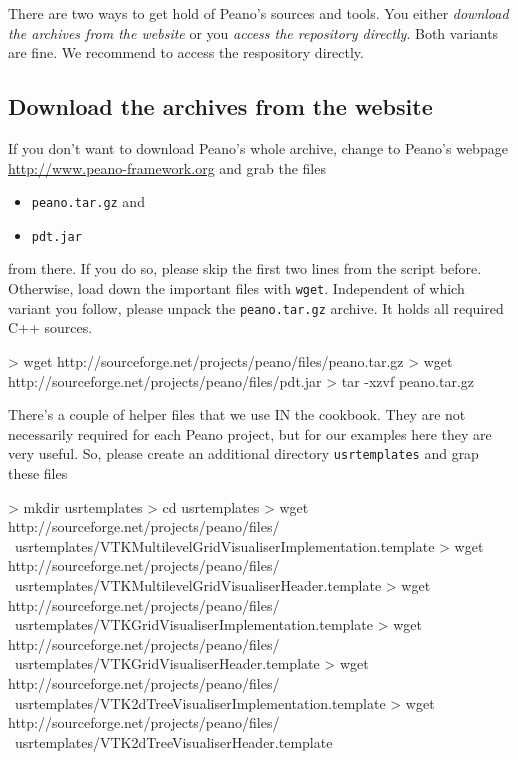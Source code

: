 There are two ways to get hold of Peano's sources and tools. You either {\em
download the archives from the website} or you {\em access the repository
directly}.
Both variants are fine.
We recommend to access the respository directly.


\subsection{Download the archives from the website}

If you don't want to download Peano's whole archive, change to Peano's webpage
\url{http://www.peano-framework.org} and grab the files
\begin{itemize}
  \item \texttt{peano.tar.gz} and
  \item \texttt{pdt.jar}
\end{itemize}
from there. If you do so, please skip the first two lines from the script
before. Otherwise, load down the important files with \texttt{wget}. 
Independent of which variant you follow, please unpack the \texttt{peano.tar.gz}
archive. 
It holds all required C++ sources.

\begin{code}
> wget http://sourceforge.net/projects/peano/files/peano.tar.gz
> wget http://sourceforge.net/projects/peano/files/pdt.jar
> tar -xzvf peano.tar.gz
\end{code}


\noindent
There's a couple of helper files that we use IN the
cookbook. 
They are not necessarily required for each Peano project, but for our examples
here they are very useful.
So, please create an additional directory \texttt{usrtemplates} and grap
these files

\begin{code}
> mkdir usrtemplates
> cd usrtemplates
> wget http://sourceforge.net/projects/peano/files/ \
  usrtemplates/VTKMultilevelGridVisualiserImplementation.template 
> wget http://sourceforge.net/projects/peano/files/ \
  usrtemplates/VTKMultilevelGridVisualiserHeader.template 
> wget http://sourceforge.net/projects/peano/files/ \
  usrtemplates/VTKGridVisualiserImplementation.template 
> wget http://sourceforge.net/projects/peano/files/ \
  usrtemplates/VTKGridVisualiserHeader.template 
> wget http://sourceforge.net/projects/peano/files/ \
  usrtemplates/VTK2dTreeVisualiserImplementation.template 
> wget http://sourceforge.net/projects/peano/files/ \
  usrtemplates/VTK2dTreeVisualiserHeader.template 
\end{code}


